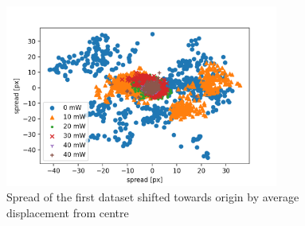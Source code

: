 \begin{figure}[!ht]
    \centering
    \includegraphics[width=0.8\textwidth,keepaspectratio]{figures/spread-dataset2.png}
    \caption{Spread of the first dataset shifted towards origin by average displacement from centre}
\end{figure}
\clearpage









